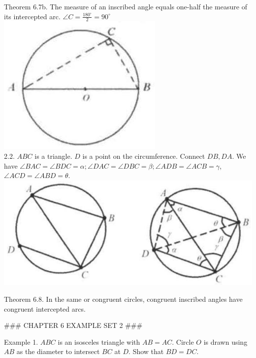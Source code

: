 \documentclass[10pt]{article}
\begin{document}
Theorem 6.7b. The measure of an inscribed angle equals one-half the measure of its intercepted arc. \(\angle C=\frac{180^{\circ}}{2}=90^{\circ}\)\\
\includegraphics[max width=\textwidth, center]{2025_04_17_97bc1f7e44d93c271a88g-162}\\
2.2. \(A B C\) is a triangle. \(D\) is a point on the circumference. Connect \(D B, D A\). We have \(\angle B A C=\angle B D C=\alpha ; \angle D A C=\angle D B C=\beta ; \angle A D B=\angle A C B=\gamma\), \(\angle A C D=\angle A B D=\theta\).\\
\includegraphics[max width=\textwidth, center]{2025_04_17_97bc1f7e44d93c271a88g-162(2)}

Theorem 6.8. In the same or congruent circles, congruent inscribed angles have congruent intercepted arcs.


### CHAPTER 6 EXAMPLE SET 2 ###

Example 1. \(A B C\) is an isosceles triangle with \(A B=A C\). Circle \(O\) is drawn using \(A B\) as the diameter to intersect \(B C\) at \(D\). Show that \(B D=D C\).
\end{document}
